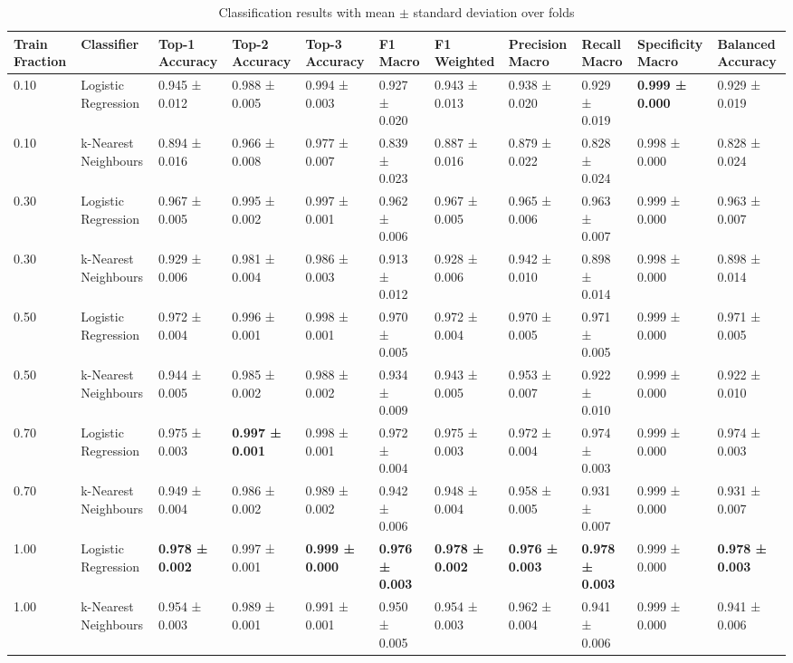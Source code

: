 
\begin{table}[ht]
\centering
\tiny
\caption{Classification results with mean $\pm$ standard deviation over folds}
\label{tab:classification_results}
\begin{tabularx}{\textwidth}{lXXXXXXXXXX}
\toprule
Train Fraction & Classifier & Top-1 Accuracy & Top-2 Accuracy & Top-3 Accuracy & F1 Macro & F1 Weighted & Precision Macro & Recall Macro & Specificity Macro & Balanced Accuracy \\
\midrule
0.10 & Logistic Regression & 0.945 ± 0.012 & 0.988 ± 0.005 & 0.994 ± 0.003 & 0.927 ± 0.020 & 0.943 ± 0.013 & 0.938 ± 0.020 & 0.929 ± 0.019 & \textbf{0.999 ± 0.000} & 0.929 ± 0.019 \\
0.10 & k-Nearest Neighbours & 0.894 ± 0.016 & 0.966 ± 0.008 & 0.977 ± 0.007 & 0.839 ± 0.023 & 0.887 ± 0.016 & 0.879 ± 0.022 & 0.828 ± 0.024 & 0.998 ± 0.000 & 0.828 ± 0.024 \\
0.30 & Logistic Regression & 0.967 ± 0.005 & 0.995 ± 0.002 & 0.997 ± 0.001 & 0.962 ± 0.006 & 0.967 ± 0.005 & 0.965 ± 0.006 & 0.963 ± 0.007 & 0.999 ± 0.000 & 0.963 ± 0.007 \\
0.30 & k-Nearest Neighbours & 0.929 ± 0.006 & 0.981 ± 0.004 & 0.986 ± 0.003 & 0.913 ± 0.012 & 0.928 ± 0.006 & 0.942 ± 0.010 & 0.898 ± 0.014 & 0.998 ± 0.000 & 0.898 ± 0.014 \\
0.50 & Logistic Regression & 0.972 ± 0.004 & 0.996 ± 0.001 & 0.998 ± 0.001 & 0.970 ± 0.005 & 0.972 ± 0.004 & 0.970 ± 0.005 & 0.971 ± 0.005 & 0.999 ± 0.000 & 0.971 ± 0.005 \\
0.50 & k-Nearest Neighbours & 0.944 ± 0.005 & 0.985 ± 0.002 & 0.988 ± 0.002 & 0.934 ± 0.009 & 0.943 ± 0.005 & 0.953 ± 0.007 & 0.922 ± 0.010 & 0.999 ± 0.000 & 0.922 ± 0.010 \\
0.70 & Logistic Regression & 0.975 ± 0.003 & \textbf{0.997 ± 0.001} & 0.998 ± 0.001 & 0.972 ± 0.004 & 0.975 ± 0.003 & 0.972 ± 0.004 & 0.974 ± 0.003 & 0.999 ± 0.000 & 0.974 ± 0.003 \\
0.70 & k-Nearest Neighbours & 0.949 ± 0.004 & 0.986 ± 0.002 & 0.989 ± 0.002 & 0.942 ± 0.006 & 0.948 ± 0.004 & 0.958 ± 0.005 & 0.931 ± 0.007 & 0.999 ± 0.000 & 0.931 ± 0.007 \\
1.00 & Logistic Regression & \textbf{0.978 ± 0.002} & 0.997 ± 0.001 & \textbf{0.999 ± 0.000} & \textbf{0.976 ± 0.003} & \textbf{0.978 ± 0.002} & \textbf{0.976 ± 0.003} & \textbf{0.978 ± 0.003} & 0.999 ± 0.000 & \textbf{0.978 ± 0.003} \\
1.00 & k-Nearest Neighbours & 0.954 ± 0.003 & 0.989 ± 0.001 & 0.991 ± 0.001 & 0.950 ± 0.005 & 0.954 ± 0.003 & 0.962 ± 0.004 & 0.941 ± 0.006 & 0.999 ± 0.000 & 0.941 ± 0.006 \\
\bottomrule
\bottomrule
\end{tabularx}
\end{table}
